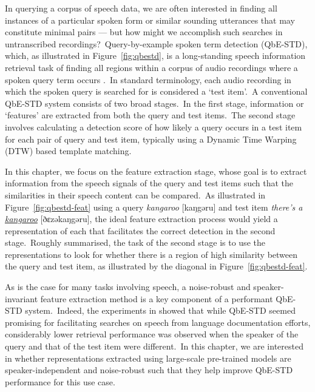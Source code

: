 \documentclass[main.tex]{subfiles}
\begin{document}
In querying a corpus of speech data, we are often interested in finding all instances of a particular spoken form or similar sounding utterances that may constitute minimal pairs --- but how might we accomplish such searches in untranscribed recordings?~Query-by-example spoken term detection (QbE-STD), which, as illustrated in Figure~\ref{fig:qbestd}, is a long-standing speech information retrieval task of finding all regions within a corpus of audio recordings where a spoken query term occurs \parencite{myersInvestigationUseDynamic1980,rohlicek1995Word,fiscusResults2006Spoken2007,rodriguez-fuentesHighperformanceQuerybyexampleSpoken2014}.~In standard terminology, each audio recording in which the spoken query is searched for is considered a `test item'.~A conventional QbE-STD system consists of two broad stages.~In the first stage, information or `features' are extracted from both the query and test items.~The second stage involves calculating a detection score of how likely a query occurs in a test item for each pair of query and test item, typically using a Dynamic Time Warping (DTW) based template matching.

In this chapter, we focus on the feature extraction stage, whose goal is to extract information from the speech signals of the query and test items such that the similarities in their speech content can be compared.~As illustrated in Figure~\ref{fig:qbestd-feat} using a query \emph{kangaroo} [{kaŋgəru}] and test item \emph{there’s a \underline{kangaroo}} [{ðɛzəkaŋgəru}], the ideal feature extraction process would yield a representation of each that facilitates the correct detection in the second stage.~Roughly summarised, the task of the second stage is to use the representations to look for whether there is a region of high similarity between the query and test item, as illustrated by the diagonal in Figure~\ref{fig:qbestd-feat}.

As is the case for many tasks involving speech, a noise-robust and speaker-invariant feature extraction method is a key component of a performant QbE-STD system.~Indeed, the experiments in \textcite{le-ferrand-etal-2020-enabling} showed that while QbE-STD seemed promising for facilitating searches on speech from language documentation efforts, considerably lower retrieval performance was observed when the speaker of the query and that of the test item were different.~In this chapter, we are interested in whether representations extracted using large-scale pre-trained models are speaker-independent and noise-robust such that they help improve QbE-STD performance for this use case.
\end{document}
